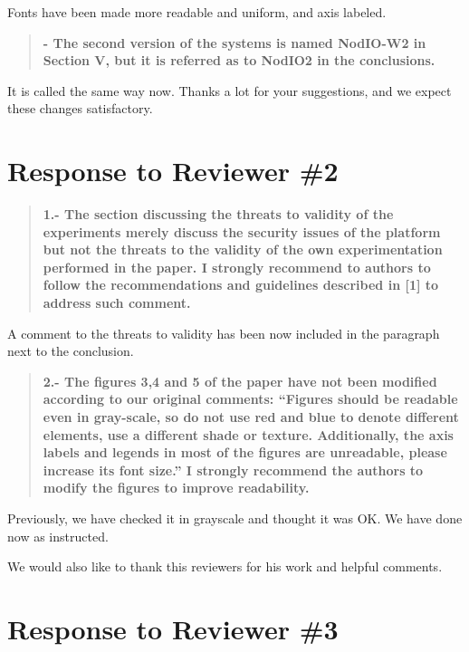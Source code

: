 \documentclass[preprint]{elsarticle}
\begin{document}
Fonts have been made more readable and uniform, and axis labeled. 

\begin{quote}
\textbf{- The second version of the systems is named NodIO-W2 in Section V, but it is referred as to
NodIO2 in the conclusions.}
\end{quote}

It is called the same way now. Thanks a lot for your suggestions, and
we expect these changes satisfactory.



\section{Response to Reviewer \#2}


\begin{quote}
\textbf{1.- The section discussing the threats to validity of the
  experiments merely discuss the security issues of the platform but
  not the threats to the validity of the own experimentation performed
  in the paper. I strongly recommend to authors to follow the
  recommendations and guidelines described in [1] to address such
  comment.\\}
\end{quote}

A comment to the threats to validity has been now included in the
paragraph next to the conclusion.

\begin{quote}
\textbf{2.- The figures 3,4 and 5 of the paper have not been modified according to our original comments: ``Figures should be readable even in gray-scale, so do not use red and blue to denote different elements, use a different shade or texture. Additionally, the axis labels and legends in most of the figures are unreadable, please increase its font size.'' I strongly recommend the authors to modify the figures to improve readability.}
\end{quote}

Previously, we have checked it in grayscale and thought it was OK. We
have done now as instructed. 

We would also like to thank this reviewers for his work and helpful
comments. 



\section{Response to Reviewer \#3}
\end{document}
